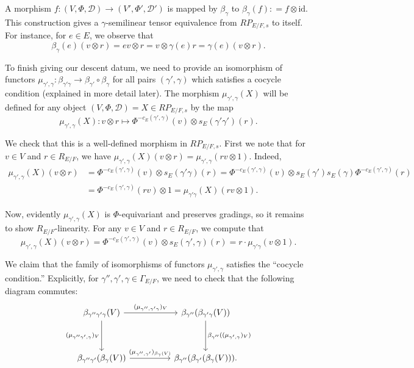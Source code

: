 \documentclass[11pt]{amsart}
\theoremstyle{definition}
\newcommand{\mc}{\mathcal}
\newcommand{\id}{\mathrm{id}}
\begin{document}
A morphism $f: (V, \Phi, \mc{D}) \to (V', \Phi', \mc{D}')$  is mapped by $\beta_{\gamma}$ to $\beta_{\gamma}(f) : = f \otimes \id$.  This construction gives a $\gamma$-semilinear tensor equivalence from $RP_{E/F,s}$ to itself. For instance, for $e \in E$, we observe that
\begin{equation*}
    \beta_{\gamma}(e)(v \otimes r) = ev \otimes r=v\otimes \gamma(e)r=\gamma(e)(v \otimes r).
\end{equation*}

To finish giving our descent datum, we need to provide an isomorphism of functors $\mu_{\gamma',\gamma} \colon \beta_{\gamma'\gamma} \to \beta_{\gamma'} \circ \beta_{\gamma}$ for all pairs $(\gamma',\gamma)$ which satisfies a cocycle condition (explained in more detail later). The morphism $\mu_{\gamma',\gamma}(X)$ will be defined for any object $(V, \Phi, \mc{D})=X \in RP_{E/F,s}$ by the map
\begin{equation*}
    \mu_{\gamma', \gamma}(X): v \otimes r \mapsto \Phi^{-c_E(\gamma', \gamma)}(v) \otimes s_E(\gamma'\gamma')(r).
\end{equation*}

We check that this is a well-defined morphism in $RP_{E/F,s}$. First we note that for $v \in V$ and $r \in R_{E/F}$, we have $\mu_{\gamma', \gamma}(X)(v \otimes r)=\mu_{\gamma', \gamma}(rv \otimes 1)$. Indeed,
\begin{align*}
    \mu_{\gamma', \gamma}(X)(v \otimes r) & = \Phi^{-c_E(\gamma',\gamma)}(v) \otimes s_E(\gamma'\gamma)(r)  = \Phi^{-c_E(\gamma',\gamma)}(v) \otimes s_E(\gamma')s_E(\gamma) \Phi^{-c_E(\gamma', \gamma)}(r)\\
    & =  \Phi^{-c_E(\gamma', \gamma)}(rv) \otimes 1 =  \mu_{\gamma'\gamma}(X)(rv \otimes 1).
\end{align*}

Now, evidently $\mu_{\gamma', \gamma}(X)$ is $\Phi$-equivariant and preserves gradings, so it remains to show $R_{E/F}$-linearity. For any $v \in V$ and $r \in R_{E/F}$, we compute that 
\begin{equation*}
    \mu_{\gamma', \gamma}(X)( v \otimes r) = \Phi^{-c_E(\gamma', \gamma)}(v) \otimes s_E(\gamma',\gamma)(r) = r\cdot \mu_{\gamma'\gamma}(v \otimes 1).
\end{equation*}

We claim that the family of isomorphisms of functors $\mu_{\gamma', \gamma}$ satisfies the ``cocycle condition.'' Explicitly, for $\gamma'', \gamma', \gamma \in \Gamma_{E/F}$, we need to check that the following diagram commutes:
\[
\begin{tikzcd}
\beta_{\gamma''\gamma'\gamma}(V) \arrow["{(\mu_{{\gamma'',\gamma'\gamma}})_{V}}"]{rr} \arrow[swap, "{(\mu_{\gamma''\gamma',\gamma})_{V}}"]{dd} & & \beta_{\gamma''}(\beta_{\gamma'\gamma}(V)) \arrow["{\beta_{\gamma''}((\mu_{{\gamma',\gamma}})_{V})}"]{dd} \\
&&\\
\beta_{\gamma''\gamma'}(\beta_{\gamma}(V)) \arrow["{(\mu_{\gamma'',\gamma'})_{\beta_{\gamma}(V)}}"]{rr} && \beta_{\gamma''}(\beta_{\gamma'}(\beta_{\gamma}(V))).
\end{tikzcd}
\]
\end{document}
